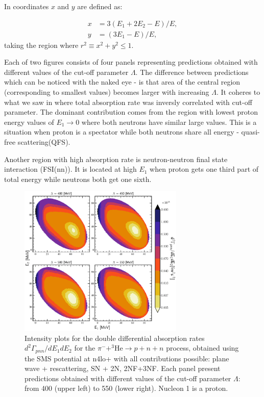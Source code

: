    In  coordinates $x$ and $y$ are defined as:

    \begin{align}
        x &= 3 (E_1 + 2E_2 - E)/E, \nonumber\\
        y &= (3E_1 - E)/E,
        \label{dalitz_xy}
    \end{align}
    taking the region where $r^2 \equiv x^2 + y^2 \leq 1$.

    Each of two figures consists of four panels representing predictions obtained with different 
    values of the cut-off parameter $\Lambda$. The difference between predictions which can be 
    noticed with the naked eye - is that area of the central region (corresponding to smallest values)
    becomes larger with increasing $\Lambda$. It coheres to what we saw in 
    where total absorption rate was inversly correlated with cut-off parameter. The dominant contribution
    comes from the region with lowest proton energy values of $E_1 \rightarrow 0$ where both neutrons have similar large values.
    This is a situation when proton is a spectator while both neutrons share all energy
    - quasi-free scattering(QFS). 

    Another region with high absorption rate is neutron-neutron final state interaction (FSI(nn)).
    It is located at high $E_1$ when proton gets one third part of total energy while neutrons both get
    one sixth.
    
        \begin{figure}[h]
            \begin{center}
            \includegraphics[width=0.7\textwidth]{PlotData/PION/Dalitz_maps/figures/Dalitz_map_pnn_E1E2_cutofs.pdf}
            \end{center}
            \caption{Intensity plots for the double differential absorption rates
            $d^2 \Gamma_{pnn}/dE_1dE_2$ for the $\pi^- + ^3\text{He} \rightarrow p + n + n$
            process, obtained using the SMS potential at \gls{n4lo+}
            with all contributions possible: plane wave + rescattering, SN + 2N, 2NF+3NF.
            Each panel present predictions obtained with different values of the cut-off parameter $\Lambda$:
            from \SI{400}{\mev} (upper left) to \SI{550}{\mev} (lower right). Nucleon 1 is a proton.}
            \label{pion_map_E1E2_cutoff}
        \end{figure}

